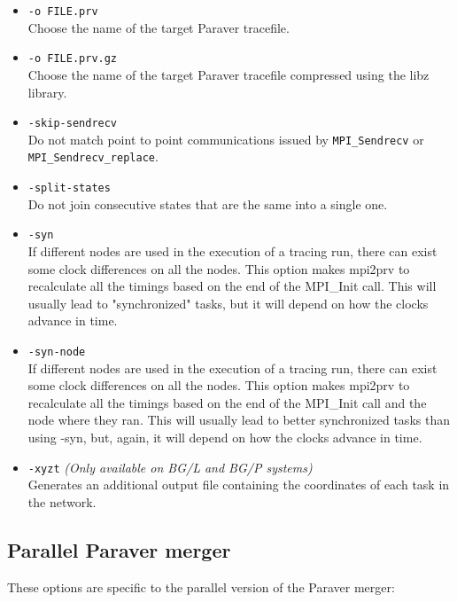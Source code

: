 \begin{itemize}
 \item {\tt -o FILE.prv}\\
 Choose the name of the target Paraver tracefile.
 \item {\tt -o FILE.prv.gz}\\
 Choose the name of the target Paraver tracefile compressed using the libz library.
 \item {\tt -skip-sendrecv}\\
 Do not match point to point communications issued by {\tt MPI\_Sendrecv} or {\tt MPI\_Sendrecv\_replace}.
 \item {\tt -split-states}\\
 Do not join consecutive states that are the same into a single one.
 \item {\tt -syn}\\
 If different nodes are used in the execution of a tracing run, there can exist some clock differences on all the nodes. This option makes mpi2prv to recalculate all the timings based on the end of the MPI\_Init call. This will usually lead to "synchronized" tasks, but it will depend on how the clocks advance in time.
 \item {\tt -syn-node}\\
 If different nodes are used in the execution of a tracing run, there can exist some clock differences on all the nodes. This option makes mpi2prv to recalculate all the timings based on the end of the MPI\_Init call and the node where they ran. This will usually lead to better synchronized tasks than using -syn, but, again, it will depend on how the clocks advance in time.
 \item {\tt -xyzt} {\em (Only available on BG/L and BG/P systems)}\\
 Generates an additional output file containing the coordinates of each task in the network.
\end{itemize}

\subsection{Parallel Paraver merger}

These options are specific to the parallel version of the Paraver merger:

